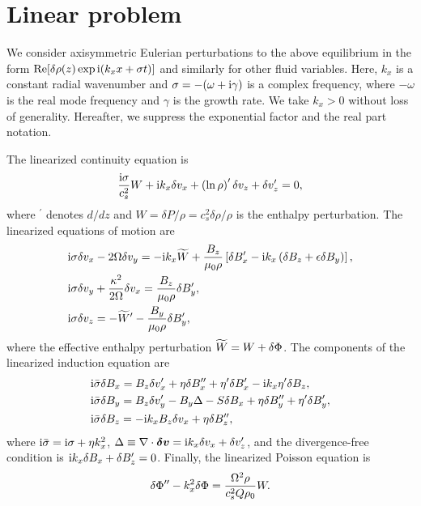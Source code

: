 \section{Linear problem}\label{linear}
We consider axisymmetric Eulerian perturbations to the above
equilibrium in the form $\operatorname{Re}[\delta\rho(z)\exp{\mathrm{i}(k_xx + \sigma
    t)}]$ and similarly for other fluid variables. Here, $k_x$ is a
constant radial wavenumber and $\sigma=-(\omega +\mathrm{i}\gamma)$ is a
complex  frequency, where $-\omega$ is the real mode frequency and $\gamma$ is
the growth rate. We take $k_x>0$ without loss of generality. 
Hereafter, we suppress the exponential factor and the real part notation. 

The linearized continuity equation is 
\begin{align}
  \frac{\mathrm{i}\sigma}{c_s^2}W + \mathrm{i} k_x \delta v_x
  +\left(\ln\rho\right)^\prime\delta v_z + \delta v_z^\prime = 0,\label{lin_cont}
\end{align}
where $^\prime$ denotes $d/dz$ and $W=\delta P/\rho =
c_s^2\delta\rho/\rho$ is the enthalpy perturbation.  
The linearized equations of motion are
\begin{align}
  &\mathrm{i}\sigma \delta v_x - 2\Omega\delta v_y  = - \mathrm{i}
  k_x\widetilde{W} + \frac{B_z}{\mu_0\rho} \left[\delta B_x^\prime - \mathrm{i} 
    k_x\left(\delta B_z + \epsilon\delta B_y\right)\right],\\
  &\mathrm{i}\sigma\delta v_y + 
    \frac{\kappa^2}{2\Omega}\delta v_x = \frac{B_z}{\mu_0\rho}\delta B_y^\prime\label{lin_vy},\\ 
  & \mathrm{i}\sigma\delta v_z = -\widetilde{W}^\prime - \frac{B_y}{\mu_0\rho}\delta B_y^\prime\label{lin_vz},  
\end{align}
where the effective enthalpy perturbation
$\widetilde{W} = W + \delta \Phi$. The components of the linearized induction equation
are 
\begin{align}
&  \mathrm{i}\bar{\sigma}\delta B_x = B_z\delta v_x^\prime +
  \eta\delta B_x^{\prime\prime}+\eta^\prime\delta B_x^\prime - \mathrm{i} k_x
  \eta^\prime \delta B_z,\label{induct_x}\\
&\mathrm{i}\bar{\sigma}\delta B_y = B_z\delta v_y^\prime -B_y\Delta - S\delta B_x +
  \eta\delta B_y^{\prime\prime}+\eta^\prime\delta B_y^\prime,\label{induct_y}\\
& \mathrm{i}\bar{\sigma}\delta B_z = -\mathrm{i}  k_xB_z \delta v_x +
\eta\delta B_z^{\prime\prime}, \label{induct_vert}
\end{align} 
where $\mathrm{i}\bar{\sigma} = \mathrm{i}\sigma + \eta k_x^2$,
$\Delta\equiv \nabla\cdot\bm{\delta v}  = \mathrm{i} k_x\delta v_x + \delta v_z^\prime$,   
and the divergence-free condition is $\mathrm{i} k_x\delta B_x +
\delta B_z^\prime=0$. Finally, the linearized Poisson equation is 
\begin{align}
  \delta \Phi^{\prime\prime} - k_x^2\delta \Phi = \frac{\Omega^2\rho}{c_s^2Q\rho_0}W.  \label{lin_poisson}
\end{align}

